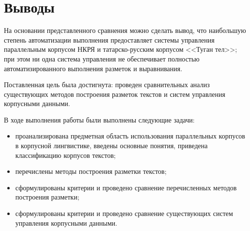 \section{Выводы}

На основании представленного сравнения можно сделать вывод, что наибольшую степень автоматизации выполнения предоставляет системы управления параллельным корпусом НКРЯ и татарско-русским корпусом <<Туган тел>>; при этом ни одна система управления не обеспечивает полностью автоматизированного выполнения разметок и выравнивания.

\clearpage


Поставленная цель была достигнута: проведен сравнительных анализ существующих методов построения разметок текстов и систем управления корпусными данными.

В ходе выполнения работы были выполнены следующие задачи:
\begin{itemize}
	\item проанализирована предметная область использования параллельных корпусов в корпусной лингвистике, введены основные понятия, приведена классификацию корпусов текстов;
	\item перечислены методы построения разметки текстов;
	\item сформулированы критерии и проведено сравнение перечисленных методов построения разметки;
	\item сформулированы критерии и проведено сравнение существующих систем управления корпусными данными.
\end{itemize}

